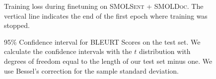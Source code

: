 \begin{figure}[H]
    \finetuningloss
    \caption{Training loss during finetuning on \textsc{SMOLSent} + \textsc{SMOLDoc}. The vertical line indicates the end of the first epoch where training was stopped.}
    \label{fig:finetuning_loss}
\end{figure}

\begin{figure}[H]
    \allscores
    \caption{95\% Confidence interval for BLEURT Scores on the test set. We calculate the confidence intervals with the $t$ distribution with degrees of freedom equal to the length of our test set minus one. We use Bessel's correction for the sample standard deviation. }
    \label{fig:confidence_intervals}
\end{figure}